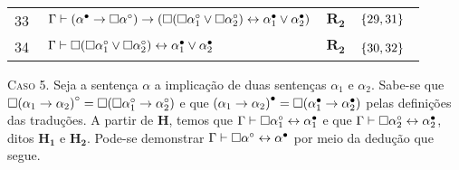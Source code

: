 \begin{tcolorbox}[enhanced jigsaw, breakable, sharp corners, colframe=black, colback=white, boxrule=0.5pt, left=1.5mm, right=1.5mm, top=1.5mm, bottom=1.5mm]
\begin{tabularx}{\textwidth}{r | X l l}
            \scriptsize{33}\phantom{ } & $\ \Gamma \vdash (\alpha^\bullet \to \Box\alpha^\circ) \to (\Box(\Box\alpha_1^\circ \vee \Box\alpha_2^\circ) \leftrightarrow \alpha_1^\bullet \vee \alpha_2^\bullet)$ & $\hyperref[modal.rule.2]{\mathbf{R_2}}$ & $\left\{29,31\right\}$\\[\rowskip]
            \scriptsize{34}\phantom{ } & $\ \Gamma \vdash \Box(\Box\alpha_1^\circ \vee \Box\alpha_2^\circ) \leftrightarrow \alpha_1^\bullet \vee \alpha_2^\bullet$ & $\hyperref[modal.rule.2]{\mathbf{R_2}}$ & $\left\{30,32\right\}$\
        \end{tabularx}
        \normalsize

        \vspace{\baselineskip}
            \textsc{Caso 5.}
            Seja a sentença $\alpha$ a implicação de duas sentenças $\alpha_1$ e $\alpha_2$.
            Sabe-se que $\Box{(\alpha_1\to\alpha_2)}^\circ=\Box(\Box\alpha_1^\circ\to\alpha_2^\circ)$ e que ${(\alpha_1\to\alpha_2)}^\bullet=\Box(\alpha_1^\bullet\to\alpha_2^\bullet)$ pelas definições das traduções.
            A partir de $\mathbf{H}$, temos que $\Gamma\mathrel{\vdash}\Box\alpha_1^\circ\leftrightarrow\alpha_1^\bullet$ e que $\Gamma\mathrel{\vdash}\Box\alpha_2^\circ\leftrightarrow\alpha_2^\bullet$, ditos $\mathbf{H_1}$ e $\mathbf{H_2}$.
            Pode-se demonstrar $\Gamma\mathrel{\vdash}\Box\alpha^\circ\leftrightarrow\alpha^\bullet$ por meio da dedução que segue.


\end{tcolorbox}
